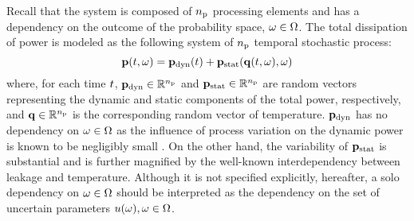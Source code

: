 Recall that the system is composed of ${n_\text{p}}$ processing elements and has a dependency on the outcome of the probability space, $\omega \in \Omega$.
The total dissipation of power is modeled as the following system of ${n_\text{p}}$ temporal stochastic process:
\begin{equation} \elabel{power-model}
  \vP(\t, \o) = \vP_\dynamic(\t) + \vP_\static(\vQ(\t, \o), \o)
\end{equation}
where, for each time $t$, $\mathbf{p}_{\text{dyn}} \in \mathbb{R}^{n_\text{p}}$ and $\mathbf{p}_{\text{stat}} \in \mathbb{R}^{n_\text{p}}$ are random vectors representing the dynamic and static components of the total power, respectively, and $\mathbf{q} \in \mathbb{R}^{n_\text{p}}$ is the corresponding random vector of temperature.
$\mathbf{p}_{\text{dyn}}$ has no dependency on $\omega \in \Omega$ as the influence of process variation on the dynamic power is known to be negligibly small \cite{srivastava2010}.
On the other hand, the variability of $\mathbf{p}_{\text{stat}}$ is substantial and is further magnified by the well-known interdependency between leakage and temperature.
Although it is not specified explicitly, hereafter, a solo dependency on $\omega \in \Omega$ should be interpreted as the dependency on the set of uncertain parameters $u(\omega), \omega \in \Omega$.
